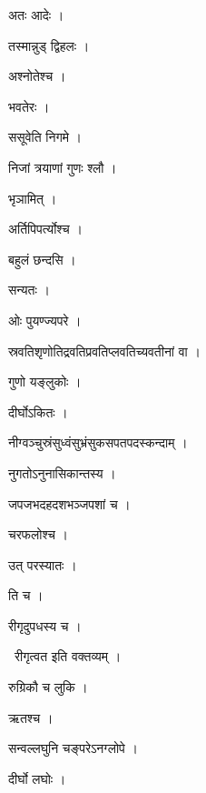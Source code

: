 \documentclass[10pt, openany, oneside]{book}
\begin{document}
\noindent अतः आदेः ।

\noindent तस्मान्नुड् द्विहलः ।

\noindent अश्नोतेश्च ।

\noindent भवतेरः ।

\noindent ससूवेति निगमे ।

\noindent निजां त्रयाणां गुणः श्लौ ।

\noindent भृञामित् ।

\noindent अर्तिपिपर्त्योश्च ।

\noindent बहुलं छन्दसि ।

\noindent सन्यतः ।

\noindent ओः पुयण्ज्यपरे ।

\noindent स्रवतिश‍ृणोतिद्रवतिप्रवतिप्लवतिच्यवतीनां वा ।

\noindent गुणो यङ्लुकोः ।

\noindent दीर्घोऽकितः ।

\noindent नीग्वञ्चुस्रंसुध्वंसुभ्रंसुकसपतपदस्कन्दाम् ।

\noindent नुगतोऽनुनासिकान्तस्य ।

\noindent जपजभदहदशभञ्जपशां च ।

\noindent चरफलोश्च ।

\noindent उत् परस्यातः ।

\noindent ति च ।

\noindent रीगृदुपधस्य च ।

\par\noindent\hspace{1.5em}{\vps वा॰}~{\qt रीगृत्वत इति वक्तव्यम् ।}

\noindent रुग्रिकौ च लुकि ।

\noindent ऋतश्च ।

\noindent सन्वल्लघुनि चङ्परेऽनग्लोपे ।

\noindent दीर्घो लघोः ।
\end{document}
